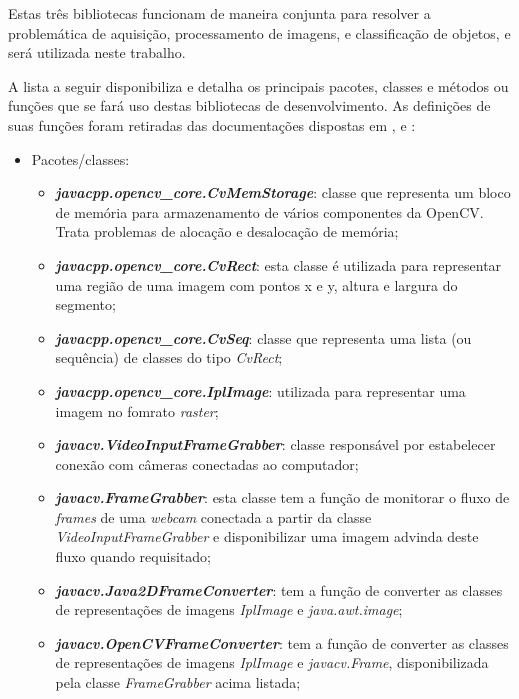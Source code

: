Estas três bibliotecas funcionam de maneira conjunta para resolver a problemática de aquisição, processamento de imagens, e classificação de objetos, e será utilizada neste trabalho. 

A lista a seguir disponibiliza e detalha os principais pacotes, classes e métodos ou funções que se fará uso destas bibliotecas de desenvolvimento. As definições de suas funções foram retiradas das documentações dispostas em \cite{opencv}, \cite{javacv} e \cite{javacpp}: 

\begin{itemize}
	\item Pacotes/classes:
	\begin{itemize}
		\item \textit{\textbf{javacpp.opencv\_core.CvMemStorage}}: classe que representa um bloco de memória para armazenamento de vários componentes da OpenCV. Trata problemas de alocação e desalocação de memória;
		
		\item \textbf{\textit{javacpp.opencv\_core.CvRect}}: esta classe é utilizada para representar uma região de uma imagem com pontos x e y, altura e largura do segmento;
		
		\item \textbf{\textit{javacpp.opencv\_core.CvSeq}}: classe que representa uma lista (ou sequência) de classes do tipo \textit{CvRect};
		
		\item \textbf{\textit{javacpp.opencv\_core.IplImage}}: utilizada para representar uma imagem no fomrato \textit{raster};
		
		\item \textbf{\textit{javacv.VideoInputFrameGrabber}}:	classe responsável por estabelecer conexão com câmeras conectadas ao computador;

		\item \textbf{\textit{javacv.FrameGrabber}}: esta classe tem a função de monitorar o fluxo de \textit{frames} de uma \textit{webcam} conectada a partir da classe \textit{VideoInputFrameGrabber} e disponibilizar uma imagem advinda deste fluxo quando requisitado;		
			
		\item \textbf{\textit{javacv.Java2DFrameConverter}}: tem a função de converter as classes de representações de imagens \textit{IplImage} e \textit{java.awt.image};
		
		\item \textbf{\textit{javacv.OpenCVFrameConverter}}: tem a função de converter as classes de representações de imagens \textit{IplImage} e \textit{javacv.Frame}, disponibilizada pela classe \textit{FrameGrabber} acima listada;
		

\end{itemize}
\end{itemize}
